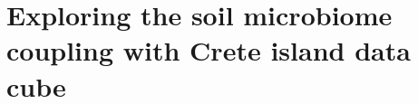 % 
% 


\chapter{Exploring the soil microbiome coupling with Crete island data cube}
\label{cha:crete-soil}



%
